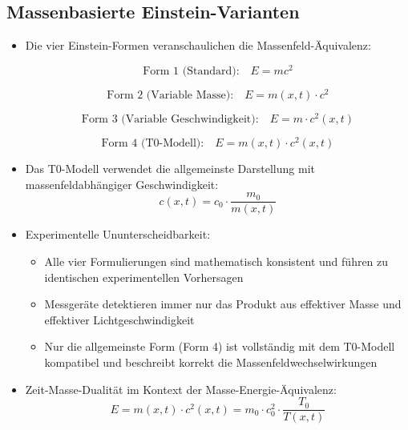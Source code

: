 \documentclass[12pt,a4paper]{article}
\begin{document}
\subsection{Massenbasierte Einstein-Varianten}
\begin{itemize}
	\item Die vier Einstein-Formen veranschaulichen die Massenfeld-Äquivalenz:
	
	\begin{equation}
		\text{Form 1 (Standard):} \quad \boxed{E = mc^2}
	\end{equation}
	
	\begin{equation}
		\text{Form 2 (Variable Masse):} \quad \boxed{E = m(x,t) \cdot c^2}
	\end{equation}
	
	\begin{equation}
		\text{Form 3 (Variable Geschwindigkeit):} \quad \boxed{E = m \cdot c^2(x,t)}
	\end{equation}
	
	\begin{equation}
		\text{Form 4 (T0-Modell):} \quad \boxed{E = m(x,t) \cdot c^2(x,t)}
	\end{equation}
	
	\item Das T0-Modell verwendet die allgemeinste Darstellung mit massenfeldabhängiger Geschwindigkeit:
	\begin{equation}
		c(x,t) = c_0 \cdot \frac{m_0}{m(x,t)}
	\end{equation}
	
	\item Experimentelle Ununterscheidbarkeit:
	\begin{itemize}
		\item Alle vier Formulierungen sind mathematisch konsistent und führen zu identischen experimentellen Vorhersagen
		\item Messgeräte detektieren immer nur das Produkt aus effektiver Masse und effektiver Lichtgeschwindigkeit
		\item Nur die allgemeinste Form (Form 4) ist vollständig mit dem T0-Modell kompatibel und beschreibt korrekt die Massenfeldwechselwirkungen
	\end{itemize}
	
	\item Zeit-Masse-Dualität im Kontext der Masse-Energie-Äquivalenz:
	\begin{equation}
		E = m(x,t) \cdot c^2(x,t) = m_0 \cdot c_0^2 \cdot \frac{T_0}{T(x,t)}
	\end{equation}
\end{itemize}
\end{document}
